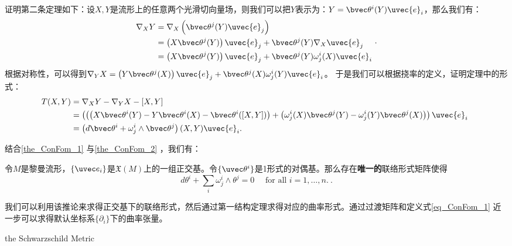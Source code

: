 证明第二条定理如下：设$X,Y$是流形上的任意两个光滑切向量场，则我们可以把$Y$表示为：$Y=\bvec \theta^i(Y)\uvec{e}_i$，那么我们有：
\begin{equation}
\begin{aligned}
\nabla_{X} Y & =\nabla_{X}\left(\bvec\theta^{j}(Y) \uvec{e}_{j}\right) \\
& =\left(X \bvec\theta^{j}(Y)\right) \uvec{e}_{j}+\bvec\theta^{j}(Y) \nabla_{X} \uvec{e}_{j} \\
& =\left(X \bvec \theta^{j}(Y)\right) \uvec{e}_{j}+\bvec\theta^{j}(Y) \omega_{j}^{i}(X) \uvec{e}_{i}
\end{aligned}~.
\end{equation}
根据对称性，可以得到$\nabla_{Y} X =\left(Y \bvec \theta^{j}(X)\right) \uvec{e}_{j}+\bvec\theta^{j}(X) \omega_{j}^{i}(Y) \uvec{e}_{i}$。
于是我们可以根据挠率的定义，证明定理中的形式：
\begin{equation}
\begin{aligned}
T(X, Y) & =\nabla_{X} Y-\nabla_{Y} X-[X, Y] \\
& =\left(\left(\left(X \bvec\theta^{i}(Y)-Y \bvec\theta^{i}(X)-\bvec\theta^{i}([X, Y])\right)+\left(\omega_{j}^{i}(X) \bvec\theta^{j}(Y)-\omega_{j}^{i}(Y) \bvec\theta^{j}(X)\right)\right) \uvec{e}_{i}\right. \\
& =\left(d \bvec \theta^{i}+\omega_{j}^{i} \wedge \bvec \theta^{j}\right)(X, Y) \uvec{e}_{i}.
\end{aligned}~
\end{equation}


结合\autoref{the_ConFom_1} 与\autoref{the_ConFom_2} ，我们有：

\begin{corollary}{}
令$M$是黎曼流形，$\{\uvec e_i\}$是$\mathfrak{X}(M)$上的一组正交基。令$\{\uvec\theta^i\}$是1形式的对偶基。那么存在\textbf{唯一的}联络形式矩阵使得
\begin{equation}
d \theta^{i}+\sum_{i} \omega_{j}^{i} \wedge \theta^{j}=0 \quad \text { for all } i=1, \ldots, n .~.
\end{equation}
\end{corollary}

我们可以利用该推论来求得正交基下的联络形式，然后通过第一结构定理求得对应的曲率形式。通过过渡矩阵和定义式\autoref{eq_ConFom_1} 近一步可以求得默认坐标系$\{\partial_i\}$下的曲率张量。
\begin{example}{the Schwarzschild Metric}

\end{example}




